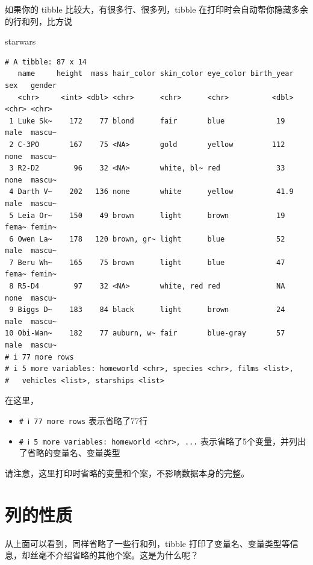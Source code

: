 \documentclass[
  letterpaper,
]{ctexbook}
\newenvironment{Shaded}{\begin{snugshade}}{\end{snugshade}}
\newcommand{\NormalTok}[1]{\textcolor[rgb]{0.00,0.23,0.31}{#1}}
\providecommand{\tightlist}{%
  \setlength{\itemsep}{0pt}\setlength{\parskip}{0pt}}\usepackage{longtable,booktabs,array}
\begin{document}
如果你的 tibble 比较大，有很多行、很多列，tibble
在打印时会自动帮你隐藏多余的行和列，比方说

\begin{Shaded}
\begin{Highlighting}[]
\NormalTok{starwars}
\end{Highlighting}
\end{Shaded}

\begin{verbatim}
# A tibble: 87 x 14
   name     height  mass hair_color skin_color eye_color birth_year sex   gender
   <chr>     <int> <dbl> <chr>      <chr>      <chr>          <dbl> <chr> <chr> 
 1 Luke Sk~    172    77 blond      fair       blue            19   male  mascu~
 2 C-3PO       167    75 <NA>       gold       yellow         112   none  mascu~
 3 R2-D2        96    32 <NA>       white, bl~ red             33   none  mascu~
 4 Darth V~    202   136 none       white      yellow          41.9 male  mascu~
 5 Leia Or~    150    49 brown      light      brown           19   fema~ femin~
 6 Owen La~    178   120 brown, gr~ light      blue            52   male  mascu~
 7 Beru Wh~    165    75 brown      light      blue            47   fema~ femin~
 8 R5-D4        97    32 <NA>       white, red red             NA   none  mascu~
 9 Biggs D~    183    84 black      light      brown           24   male  mascu~
10 Obi-Wan~    182    77 auburn, w~ fair       blue-gray       57   male  mascu~
# i 77 more rows
# i 5 more variables: homeworld <chr>, species <chr>, films <list>,
#   vehicles <list>, starships <list>
\end{verbatim}

在这里，

\begin{itemize}
\tightlist
\item
  \texttt{\#\ ℹ\ 77\ more\ rows} 表示省略了77行
\item
  \texttt{\#\ ℹ\ 5\ more\ variables:\ homeworld\ \textless{}chr\textgreater{},\ ...}
  表示省略了5个变量，并列出了省略的变量名、变量类型
\end{itemize}

请注意，这里打印时省略的变量和个案，不影响数据本身的完整。

\hypertarget{ux5217ux7684ux6027ux8d28}{%
\section{列的性质}\label{ux5217ux7684ux6027ux8d28}}

从上面可以看到，同样省略了一些行和列，tibble
打印了变量名、变量类型等信息，却丝毫不介绍省略的其他个案。这是为什么呢？
\end{document}
